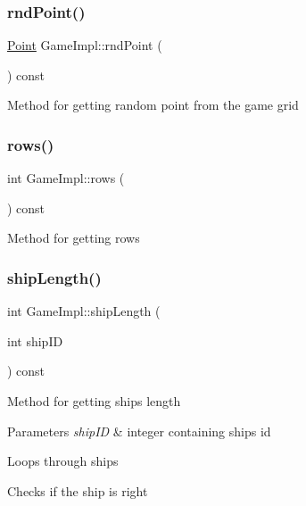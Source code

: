 \subsubsection{\texorpdfstring{rnd\+Point()}{rndPoint()}}
{\footnotesize\ttfamily \mbox{\hyperlink{class_point}{Point}} Game\+Impl\+::rnd\+Point (\begin{DoxyParamCaption}{ }\end{DoxyParamCaption}) const}

Method for getting random point from the game grid \mbox{\label{class_game_impl_a705c32b11b7cfaf9e8fd442c6434f7df}} 
\subsubsection{\texorpdfstring{rows()}{rows()}}
{\footnotesize\ttfamily int Game\+Impl\+::rows (\begin{DoxyParamCaption}{ }\end{DoxyParamCaption}) const}

Method for getting rows \mbox{\label{class_game_impl_aa3b7b99102e9bcb3c9d06a1d3c672dc0}} 
\subsubsection{\texorpdfstring{ship\+Length()}{shipLength()}}
{\footnotesize\ttfamily int Game\+Impl\+::ship\+Length (\begin{DoxyParamCaption}\item[{int}]{ship\+ID }\end{DoxyParamCaption}) const}

Method for getting ship\textquotesingle{}s length 
\begin{DoxyParams}{Parameters}
{\em ship\+ID} & integer containing ship\textquotesingle{}s id \\
\hline
\end{DoxyParams}
Loops through ships

Checks if the ship is right \mbox{\label{class_game_impl_ad39261b5f7198a6bacf99188e1108a50}} 
